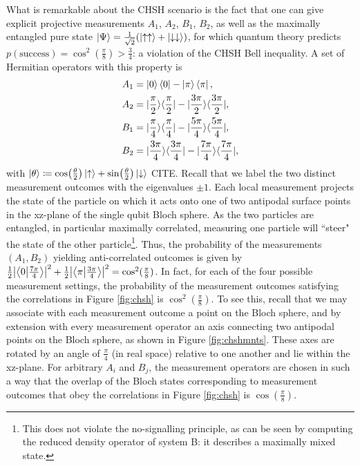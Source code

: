 What is remarkable about the CHSH scenario is the fact that one can give explicit projective measurements $A_{1}$, $A_{2}$, $B_{1}$, $B_{2}$, as well as the maximally entangled pure state $\ket{\Psi} =\frac{1}{\sqrt{2}}(\ket{\uparrow\uparrow} +\ket{\downarrow\downarrow})$, for which quantum theory predicts $p(\text{{success}})=\cos^{2}(\frac{\pi}{8})>\frac{3}{4}$: a violation of the CHSH Bell inequality. A set of Hermitian operators with this property is 
\begin{equation}
\label{eqn:chshmnts}
\begin{split}
A_{1} & =\ket{0}\bra{0}-\ket{\pi}\bra{\pi},\\
A_{2} & =|\frac{\pi}{2}\rangle\langle\frac{\pi}{2}|-|\frac{3\pi}{2}\rangle\langle\frac{3\pi}{2}|,\\
B_{1} & =|\frac{\pi}{4}\rangle\langle\frac{\pi}{4}|-|\frac{5\pi}{4}\rangle\langle\frac{5\pi}{4}|,\\
B_{2} & =|\frac{3\pi}{4}\rangle\langle\frac{3\pi}{4}|-|\frac{7\pi}{4}\rangle\langle\frac{7\pi}{4}|,
\end{split}
\end{equation}
with $\ket{\theta} \coloneqq\cos(\frac{\theta}{2})\ket{\uparrow} +\sin(\frac{\theta}{2})\ket{\downarrow}$ CITE. Recall that we label the two distinct measurement outcomes with the eigenvalues $\pm 1$. Each local measurement projects the state of the particle on which it acts onto one of two antipodal surface points in the xz-plane of the single qubit Bloch sphere. As the two particles are entangled, in particular maximally correlated, measuring one particle will ``steer" the state of the other particle\footnote{This does not violate the no-signalling principle, as can be seen by computing the reduced density operator of system B: it describes a maximally mixed state.}. Thus, the probability of the measurements $(A_1,B_2)$ yielding anti-correlated outcomes is given by $\frac{1}{2}\abs{\bra{0}\ket{\frac{7\pi}{4}}}^2+\frac{1}{2}\abs{\bra{\pi}\ket{\frac{3\pi}{4}}}^2=\cos^2(\frac{\pi}{8})$. In fact, for each of the four possible measurement settings, the probability of the measurement outcomes satisfying the correlations in Figure \ref{fig:chsh} is $\cos^2(\frac{\pi}{8})$. To see this, recall that we may associate with each measurement outcome a point on the Bloch sphere, and by extension with every measurement operator an axis connecting two antipodal points on the Bloch sphere, as shown in Figure \ref{fig:chshmnts}. These axes are rotated by an angle of $\frac{\pi}{4}$ (in real space) relative to one another and lie within the xz-plane. For arbitrary $A_i$ and $B_j$, the measurement operators are chosen in such a way that the overlap of the Bloch states corresponding to measurement outcomes that obey the correlations in Figure \ref{fig:chsh} is $\cos(\frac{\pi}{8})$.

